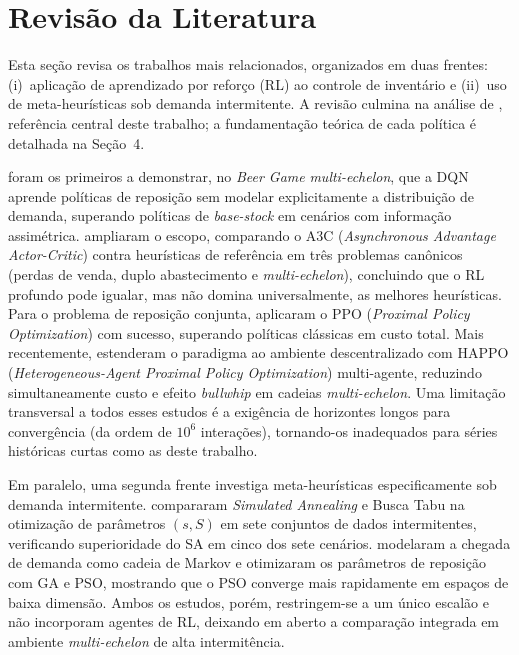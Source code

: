 \documentclass[a4paper,11pt]{article}
\begin{document}
\section{Revisão da Literatura}

Esta seção revisa os trabalhos mais relacionados, organizados em
duas frentes: (i)~aplicação de aprendizado por reforço (RL) ao controle
de inventário e (ii)~uso de meta-heurísticas sob demanda intermitente.
A revisão culmina na análise de \citet{zabraoui:2025}, referência
central deste trabalho; a fundamentação teórica de cada política é
detalhada na Seção~4.

\citet{oroojlooyjadid:2022} foram os primeiros a demonstrar, no
\textit{Beer Game} \textit{multi-echelon}, que a DQN aprende políticas de reposição
sem modelar explicitamente a distribuição de demanda, superando
políticas de \textit{base-stock} em cenários com informação assimétrica.
\citet{gijsbrechts:2022} ampliaram o escopo, comparando o
A3C (\textit{Asynchronous Advantage Actor-Critic}) contra
heurísticas de referência em três problemas canônicos (perdas de
venda, duplo abastecimento e \textit{multi-echelon}), concluindo que o RL
profundo pode igualar, mas não domina universalmente, as melhores
heurísticas. Para o problema de reposição conjunta,
\citet{vanvuchelen:2020} aplicaram o PPO (\textit{Proximal Policy Optimization})
com sucesso, superando políticas clássicas em custo total. Mais recentemente,
\citet{liu:2024} estenderam o paradigma ao ambiente descentralizado
com HAPPO (\textit{Heterogeneous-Agent Proximal Policy Optimization})
multi-agente, reduzindo simultaneamente custo e efeito
\textit{bullwhip} em cadeias \textit{multi-echelon}. Uma limitação
transversal a todos esses estudos é a exigência de horizontes longos
para convergência (da ordem de $10^6$ interações), tornando-os
inadequados para séries históricas curtas como as deste trabalho.

Em paralelo, uma segunda frente investiga meta-heurísticas
especificamente sob demanda intermitente. \citet{yuna:2023}
compararam \textit{Simulated Annealing} e Busca Tabu na otimização
de parâmetros $(s,S)$ em sete conjuntos de dados intermitentes,
verificando superioridade do SA em cinco dos sete cenários.
\citet{erkayman:2025} modelaram a chegada de demanda como cadeia de
Markov e otimizaram os parâmetros de reposição com GA e PSO,
mostrando que o PSO converge mais rapidamente em espaços de baixa
dimensão. Ambos os estudos, porém, restringem-se a um único escalão
e não incorporam agentes de RL, deixando em aberto a comparação
integrada em ambiente \textit{multi-echelon} de alta intermitência.
\end{document}
